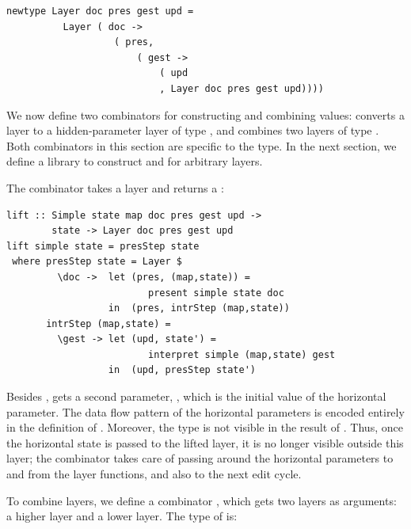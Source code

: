 \documentclass[preprint,natbib]{sigplanconf}
\begin{document}
\begin{small}
\begin{verbatim}
newtype Layer doc pres gest upd = 
          Layer ( doc -> 
                   ( pres, 
                       ( gest -> 
                           ( upd 
                           , Layer doc pres gest upd))))
\end{verbatim}
\end{small}

We now define two combinators for constructing and combining  values:  converts  a  layer to a hidden-parameter layer of type , and  combines two layers of type . Both combinators in this section are specific to the  type. In the next section, we define a library to construct  and  for arbitrary layers.



The combinator  takes a  layer and returns a :

\begin{small}
\begin{verbatim}
lift :: Simple state map doc pres gest upd ->
        state -> Layer doc pres gest upd
lift simple state = presStep state 
 where presStep state = Layer $
         \doc ->  let (pres, (map,state)) = 
                         present simple state doc                                         
                  in  (pres, intrStep (map,state))
       intrStep (map,state) =
         \gest -> let (upd, state') = 
                         interpret simple (map,state) gest                     
                  in  (upd, presStep state')
\end{verbatim}%
\end{small}

Besides ,  gets a second parameter, , which is the initial value of the horizontal parameter. The data flow pattern of the horizontal parameters is encoded entirely in the definition of . Moreover, the  type is not visible in the result of . Thus, once the horizontal state is passed to the lifted layer, it is no longer visible outside this layer; the  combinator takes care of passing around the horizontal parameters to and from the layer functions, and also to the next edit cycle. 



To combine layers, we define a combinator , which gets two layers as arguments: a higher layer and a lower layer. The type of  is:
\end{document}
